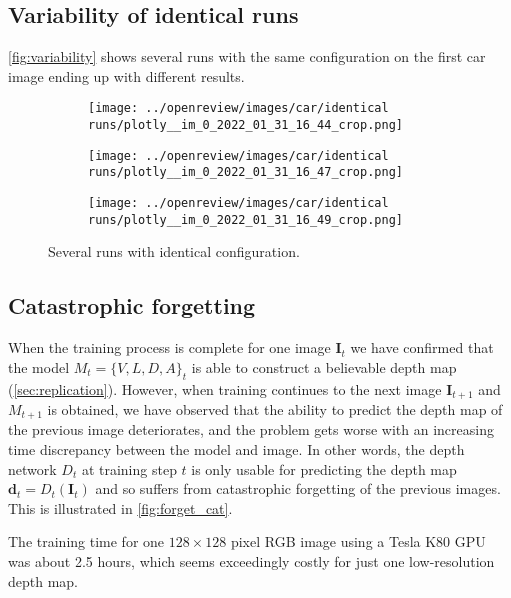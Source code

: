 \subsection{Variability of identical runs}
\label{app:variability}
\autoref{fig:variability} shows several runs with the same configuration on the first car image ending up with different results.
\begin{figure}[!htb]
\centering
\begin{subfigure}{0.32\textwidth}
    \centering
    \texttt{[image: ../openreview/images/car/identical runs/plotly\_\_im\_0\_2022\_01\_31\_16\_44\_crop.png]}
    \caption{}
    
\end{subfigure}
\begin{subfigure}{0.32\textwidth}
    \centering
    \texttt{[image: ../openreview/images/car/identical runs/plotly\_\_im\_0\_2022\_01\_31\_16\_47\_crop.png]}
    \caption{}
    
\end{subfigure}
\begin{subfigure}{0.32\textwidth}
    \centering
    \texttt{[image: ../openreview/images/car/identical runs/plotly\_\_im\_0\_2022\_01\_31\_16\_49\_crop.png]}
    \caption{}
    
\end{subfigure}
    \caption{Several runs with identical configuration.}
    \label{fig:variability}
\end{figure}
\newpage
\subsection{Catastrophic forgetting}
\label{app:forget}
When the training process is complete for one image $\textbf{I}_t$ we have confirmed that the model $M_t = \{V, L, D, A\}_t$ is able to construct a believable depth map (\autoref{sec:replication}). However, when training continues to the next image $\textbf{I}_{t+1}$ and $M_{t+1}$ is obtained, we have observed that the ability  to predict the depth map of the previous image deteriorates, and the problem gets worse with an increasing time discrepancy between the model and image. %
In other words, the depth network $D_{t}$ at training step $t$ is only usable for predicting the depth map $\textbf{d}_t = D_t(\textbf{I}_t)$ and so suffers from catastrophic forgetting of the previous images. This is illustrated in \autoref{fig:forget_cat}.

The training time for one $128 \times 128$ pixel RGB image using a Tesla K80 GPU was about 2.5 hours, which seems exceedingly costly for just one low-resolution depth map.

